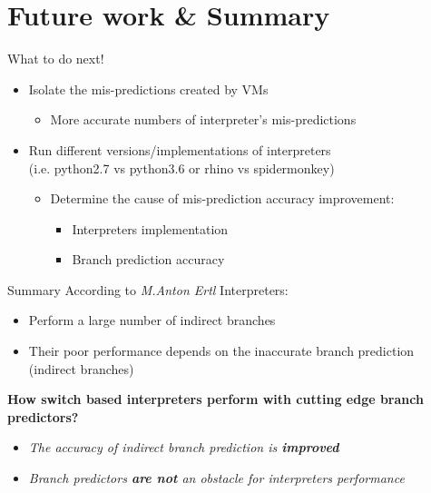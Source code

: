 \documentclass[10pt]{beamer}
\begin{document}
\section{Future work \& Summary}
\begin{frame}{What to do next!}
	\begin{itemize}
		\item {Isolate the mis-predictions created by VMs}
		\begin{itemize}
			\item{More accurate numbers of interpreter's mis-predictions}
		\end{itemize}
		\item {Run different versions/implementations of interpreters\\\small (i.e. python2.7 vs python3.6 or rhino vs spidermonkey)}
			\begin{itemize}
				\item{Determine the cause of mis-prediction accuracy improvement:}
				\begin{itemize}
						\item {Interpreters implementation}
						\item {Branch prediction accuracy}
				\end{itemize}
			\end{itemize}
	\end{itemize}
\end{frame}
\begin{frame}{Summary}
	According to \textit{M.Anton Ertl\footnotemark[1]} Interpreters:
		\begin{itemize}
			\item{Perform a large number of indirect branches}
			\item{Their poor performance depends on the inaccurate branch prediction (indirect branches)}
		\end{itemize}
		\textbf{How switch based interpreters perform with cutting edge branch predictors?}
		\begin{itemize}
			\item{\textit{The accuracy of indirect branch prediction is \textbf{improved}}}
			
			\begin{table}[]
				\captionsetup{font=small}
				\centering
			\caption{AVG MPKI of all benchmarks}
			\end{table}
			\item{\textit{Branch predictors \textbf{are not} an obstacle for interpreters performance}}
		\end{itemize}
\end{frame}
\end{document}
